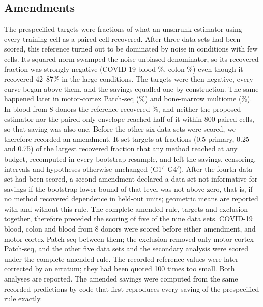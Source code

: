 \subsection*{Amendments}
The prespecified targets were fractions of what an unshrunk estimator using every training cell as a paired cell recovered. After three data sets had been scored, this reference turned out to be dominated by noise in conditions with few cells. Its squared norm swamped the noise-unbiased denominator, so its recovered fraction was strongly negative (COVID-19 blood \GenRefStephenson\%, colon \GenRefColon\%) even though it recovered 42--87\% in the large conditions. The targets were then negative, every curve began above them, and the savings equalled one by construction. The same happened later in motor-cortex Patch-seq (\GenRefScala\%) and bone-marrow multiome (\GenRefBmMulti\%). In blood from 8 donors the reference recovered \GenRefHao\%, and neither the proposed estimator nor the paired-only envelope reached half of it within 800 paired cells, so that saving was also one. Before the other six data sets were scored, we therefore recorded an amendment. It set targets at fractions (0.5 primary, 0.25 and 0.75) of the largest recovered fraction that any method reached at any budget, recomputed in every bootstrap resample, and left the savings, censoring, intervals and hypotheses otherwise unchanged (G1$'$--G4$'$). After the fourth data set had been scored, a second amendment declared a data set not informative for savings if the bootstrap lower bound of that level was not above zero, that is, if no method recovered dependence in held-out units; geometric means are reported with and without this rule. The complete amended rule, targets and exclusion together, therefore preceded the scoring of five of the nine data sets. COVID-19 blood, colon and blood from 8 donors were scored before either amendment, and motor-cortex Patch-seq between them; the exclusion removed only motor-cortex Patch-seq, and the other five data sets and the secondary analysis were scored under the complete amended rule. The recorded reference values were later corrected by an erratum; they had been quoted 100 times too small. Both analyses are reported. The amended savings were computed from the same recorded predictions by code that first reproduces every saving of the prespecified rule exactly.

